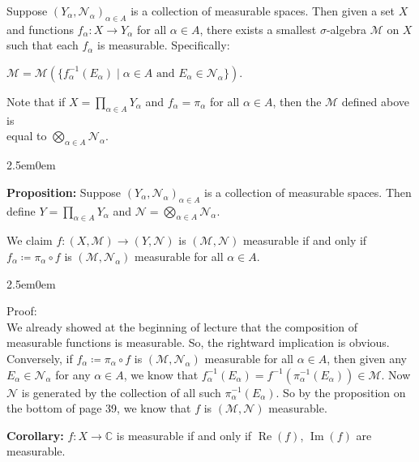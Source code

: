 \documentclass{book}
\newcommand{\hTwo}{%
\color{MidnightBlue}%
   \fontsize{13}{15}\selectfont%
}
\newcommand{\hThree}{%
   \color{PineGreen!85!Orange}
   \fontsize{12}{14}\selectfont%
}
\newenvironment{myIndent}{%
   \begin{adjustwidth}{2.5em}{0em}%
}{%
   \end{adjustwidth}%
}
\newcommand{\blab}[1]{\textbf{#1}}
\DeclareMathOperator{\rea}{Re}
\DeclareMathOperator{\ima}{Im}
\newcommand{\retTwo}{\hfill\bigbreak}
\begin{document}
Suppose $(Y_\alpha, \mathcal{N}_\alpha)_{\alpha \in A}$ is a collection of measurable spaces. Then given a set $X$ and functions $f_\alpha: X \longrightarrow Y_\alpha$ for all $\alpha \in A$, there exists a smallest $\sigma$-algebra $\mathcal{M}$ on $X$ such that each $f_\alpha$ is measurable. Specifically:

{\centering $\mathcal{M} = \mathcal{M}(\{f_\alpha^{-1}(E_\alpha) \mid \alpha \in A \text{ and } E_\alpha \in \mathcal{N}_\alpha\})$.\retTwo\par}

Note that if $X = \prod\limits_{\alpha \in A}Y_\alpha$ and $f_\alpha = \pi_\alpha$ for all $\alpha \in A$, then the $\mathcal{M}$ defined above is\\ [-8pt] equal to $\bigotimes\limits_{\alpha \in A} \mathcal{N}_\alpha$.\newpage

\begin{myIndent}\hTwo
   \blab{Proposition:} Suppose $(Y_\alpha, \mathcal{N}_\alpha)_{\alpha \in A}$ is a collection of measurable spaces. Then\\ define $Y = \prod\limits_{\alpha \in A}Y_\alpha$ and $\mathcal{N} = \bigotimes\limits_{\alpha \in A}\mathcal{N}_\alpha$.\retTwo

   We claim $f: (X, \mathcal{M}) \longrightarrow (Y, \mathcal{N})$ is $(\mathcal{M}, \mathcal{N})$ measurable if and only if $f_\alpha \coloneq \pi_\alpha \circ f$ is $(\mathcal{M}, \mathcal{N}_\alpha)$ measurable for all $\alpha \in A$.
   
   \begin{myIndent}\hThree
      Proof:\\
      We already showed at the beginning of lecture that the composition of measurable functions is measurable. So, the rightward implication is obvious. Conversely, if $f_\alpha \coloneq \pi_\alpha \circ f$ is $(\mathcal{M}, \mathcal{N}_\alpha)$ measurable for all $\alpha \in A$, then given any $E_\alpha \in \mathcal{N}_\alpha$ for any $\alpha \in A$, we know that $f_\alpha^{-1}(E_\alpha) = f^{-1}(\pi_\alpha^{-1}(E_\alpha)) \in \mathcal{M}$. Now $\mathcal{N}$ is generated by the collection of all such $\pi_\alpha^{-1}(E_\alpha)$. So by the proposition on the bottom of page 39, we know that $f$ is $(\mathcal{M}, \mathcal{N})$ measurable.\retTwo
   \end{myIndent}

   \blab{Corollary:} $f : X \longrightarrow \mathbb{C}$ is measurable if and only if $\rea(f)$, $\ima(f)$ are measurable.\retTwo
\end{myIndent}
\end{document}
